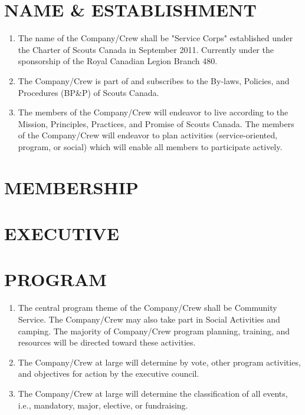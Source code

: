 \documentclass{Service_Corps_Document}
\begin{document}
    \def \Title {Constitution}
    \def \Company {Service Corps}
    \def \versionNumber {4.0}
    \stdFooter
    \begin{titlepage}
        \stdTitlePage
    \end{titlepage}

    \tableofcontents

    \newpage


    \section{NAME \& ESTABLISHMENT}
    \begin{enumerate}
        \item The name of the Company/Crew shall be "Service Corps" established under the Charter of Scouts Canada in September 2011.
        Currently under the sponsorship of the Royal Canadian Legion Branch 480.
        \item The Company/Crew is part of and subscribes to the By-laws, Policies, and Procedures (BP\&P) of Scouts Canada.
        \item The members of the Company/Crew will endeavor to live according to the Mission, Principles, Practices, and Promise of Scouts Canada.
        The members of the Company/Crew will endeavor to plan activities (service-oriented, program, or social) which will enable all members to participate actively.
    \end{enumerate}


    \section{MEMBERSHIP}
    


    \section{EXECUTIVE}
    


    \section{PROGRAM}
    \begin{enumerate}
        \item The central program theme of the Company/Crew shall be Community Service.
        The Company/Crew may also take part in Social Activities and camping.
        The majority of Company/Crew program planning, training, and resources will be directed toward these activities.
        \item The Company/Crew at large will determine by vote, other program activities, and objectives for action by the executive council.
        \item The Company/Crew at large will determine the classification of all events, i.e., mandatory, major, elective, or fundraising.
    \end{enumerate}
\end{document}
